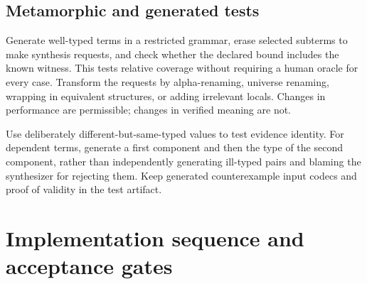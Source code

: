 \subsection{Metamorphic and generated tests}

Generate well-typed terms in a restricted grammar, erase selected subterms to
make synthesis requests, and check whether the declared bound includes the
known witness. This tests relative coverage without requiring a human oracle
for every case. Transform the requests by alpha-renaming, universe renaming,
wrapping in equivalent structures, or adding irrelevant locals. Changes in
performance are permissible; changes in verified meaning are not.

Use deliberately different-but-same-typed values to test evidence identity.
For dependent terms, generate a first component and then the type of the second
component, rather than independently generating ill-typed pairs and blaming
the synthesizer for rejecting them. Keep generated counterexample input codecs
and proof of validity in the test artifact.

\section{Implementation sequence and acceptance gates}\label{sec:roadmap}

